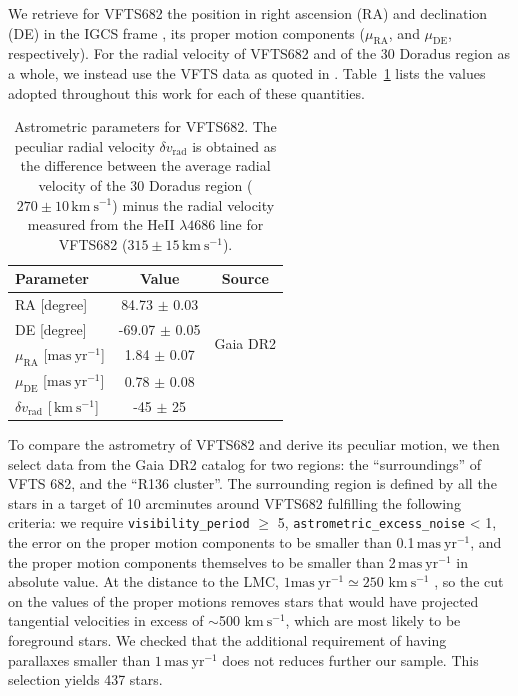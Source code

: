 \documentclass{aa}
\newcommand{\kms}{{\,\mathrm{km\ s^{-1}}}}
\DeclareRobustCommand{\Tabref}[1]{Table~\ref{#1}}
\begin{document}

We retrieve for VFTS682 the position in right ascension (RA) and declination (DE)
in the IGCS frame \cite[][]{brown:18}, its
proper motion components ($\mu_\mathrm{RA}$, and $\mu_\mathrm{DE}$,
respectively). For the radial velocity of VFTS682 and of the 30 Doradus
region as a whole, we instead use the VFTS data
as quoted in \cite{bestenlehner:11}. \Tabref{tab:vfts682} lists the values adopted throughout
this work for each of these quantities.

\begin{table}[tbp]
  \centering
    \caption{Astrometric parameters for VFTS682. The peculiar radial
    velocity $\delta v_\mathrm{rad}$ is obtained as the difference
    between the average radial velocity of the 30 Doradus region
    ($270\pm10\kms$) minus the radial velocity measured from the HeII $\lambda4686$
    line for VFTS682 ($315\pm15\kms$).}

  \begin{tabular}[htbp]{l|c|c}
    Parameter & Value & Source\\ \hline\hline
    RA \hfill[degree] &  \phantom{-}84.73 $\pm$  0.03 & \multirow{4}{*}{Gaia DR2}\\
    DE \hfill [degree] & -69.07 $\pm$  0.05  & \\
    $\mu_\mathrm{RA}$  \hfill[$\mathrm{mas\ yr^{-1}}$] & \phantom{-0}1.84 $\pm$ 0.07 & \\
    $\mu_\mathrm{DE}$  \hfill[$\mathrm{mas\ yr^{-1}}$] & \phantom{-0}0.78 $\pm$ 0.08& \\
    $\delta v_\mathrm{rad}$  \hfill[$\kms$] & \phantom{0}-45 $\pm$ 25 & \cite{bestenlehner:11}\\
    \hline
  \end{tabular}
  \label{tab:vfts682}
\end{table}

To compare the astrometry of VFTS682 and derive its peculiar motion,
we then select data from the Gaia DR2 catalog for two regions: the
``surroundings'' of VFTS 682, and the ``R136 cluster''. The
surrounding region is defined by all the stars in a target of 10 arcminutes around
VFTS682 fulfilling the following criteria: we require \texttt{visibility\_period} $\geq$ 5,
\texttt{astrometric\_excess\_noise} < 1, the error on the proper
motion components to be smaller than 0.1\,$\mathrm{mas\ yr^{-1}}$,
and the proper motion components themselves to be smaller than
2\,$\mathrm{mas\ yr^{-1}}$ in absolute value. At the distance to the
LMC, $1\mathrm{mas\ yr^{-1}}\simeq250\,\kms$ \citep[e.g.,][]{lennon:18}, so the cut on the values
of the proper motions removes stars that would have projected
tangential velocities in excess of $\sim$500\,$\kms$, which are most
likely to be foreground stars. We checked that the additional
requirement of having parallaxes smaller than $1\,\mathrm{mas\
  yr^{-1}}$ does not reduces further our sample. This selection yields 437 stars.
\end{document}
